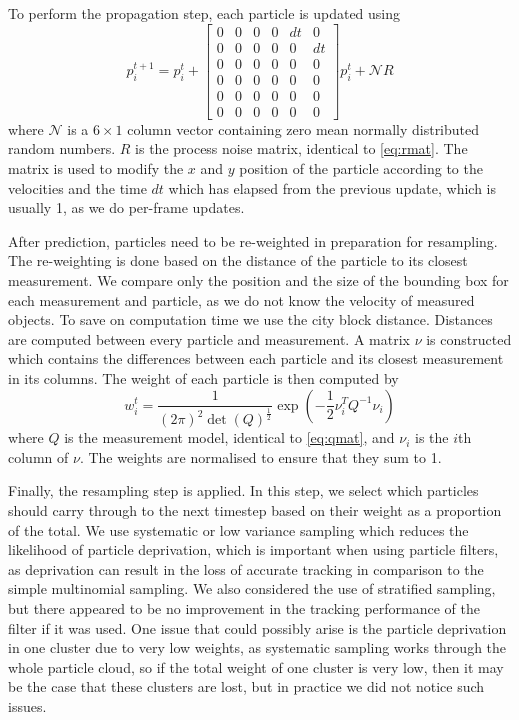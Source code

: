 \documentclass[conference]{IEEEtran}
\begin{document}
To perform the propagation step, each particle is updated using
\begin{equation}
  p_i^{t+1}=p_i^t +
  \begin{bmatrix}
    0&0&0&0&dt&0\\
    0&0&0&0&0&dt\\
    0&0&0&0&0&0\\
    0&0&0&0&0&0\\
    0&0&0&0&0&0\\
    0&0&0&0&0&0
  \end{bmatrix}
  p_i^t + \mathcal{N}R
\end{equation}
where $\mathcal{N}$ is a $6\times 1$ column vector containing zero mean normally
distributed random numbers. $R$ is the process noise matrix, identical to
\eqref{eq:rmat}. The matrix is used to modify the $x$ and $y$ position of the
particle according to the velocities and the time $dt$ which has elapsed from
the previous update, which is usually 1, as we do per-frame updates.

After prediction, particles need to be re-weighted in preparation for
resampling. The re-weighting is done based on the distance of the particle to
its closest measurement. We compare only the position and the size of the
bounding box for each measurement and particle, as we do not know the velocity
of measured objects. To save on computation time we use the city block
distance. Distances are computed between every particle and measurement. A
matrix $\nu$ is constructed which contains the differences between each particle
and its closest measurement in its columns. The weight of each particle is then
computed by
\begin{equation}
  \label{eq:pwt}
  w_i^t=\frac{1}{(2\pi)^2\det(Q)^{\frac{1}{2}}}\exp{\left(-\frac{1}{2}\nu_i^TQ^{-1}\nu_i\right)}
\end{equation}
where $Q$ is the measurement model, identical to \eqref{eq:qmat}, and $\nu_i$ is
the $i$th column of $\nu$. The weights are normalised to ensure that they sum to
1.

Finally, the resampling step is applied. In this step, we select which particles
should carry through to the next timestep based on their weight as a proportion
of the total. We use systematic or low variance sampling which reduces the
likelihood of particle deprivation, which is important when using particle
filters, as deprivation can result in the loss of accurate tracking in
comparison to the simple multinomial sampling. We also considered the use of
stratified sampling, but there appeared to be no improvement in the tracking
performance of the filter if it was used. One issue that could possibly arise is
the particle deprivation in one cluster due to very low weights, as systematic
sampling works through the whole particle cloud, so if the total weight of one
cluster is very low, then it may be the case that these clusters are lost, but
in practice we did not notice such issues.
\end{document}
